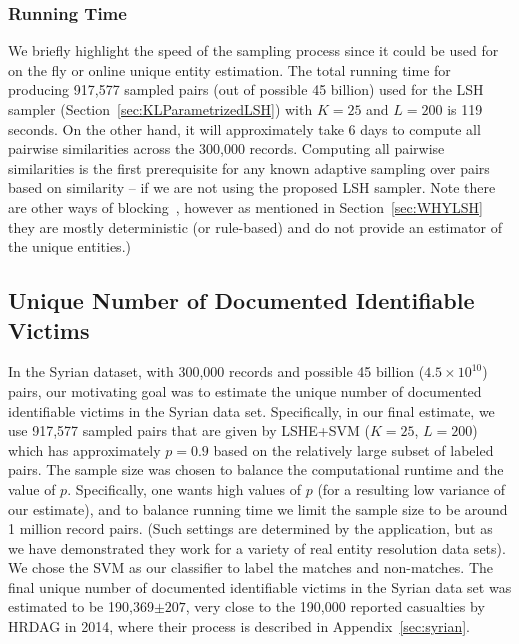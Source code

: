 \documentclass[aoas]{imsart}
\begin{document}

\subsubsection{Running Time}

We briefly highlight the speed of the sampling process since it could be used for on the fly or online unique entity estimation.
The total running time for producing 917,577 sampled pairs (out of possible 45 billion) used for the LSH sampler (Section~\ref{sec:KLParametrizedLSH}) with $K=25$ and $L=200$ is 119 seconds. On the other hand, it will approximately take 6 days to compute all pairwise similarities across the 300,000 records. Computing all pairwise similarities is the first prerequisite for any known adaptive sampling over pairs based on similarity -- if we are not using the proposed LSH sampler.
Note there are other ways of blocking~\citep{christen_2012}, however as mentioned in Section~\ref{sec:WHYLSH} they are mostly deterministic (or rule-based) and do not provide an estimator of the unique entities.)



\subsection{Unique Number of Documented Identifiable Victims}

In the Syrian dataset, with 300,000 records and possible 45 billion ($4.5 \times 10^{10}$) pairs, our motivating goal was to estimate the unique number of documented identifiable victims in the Syrian data set. Specifically, in our final estimate, we use
917,577 sampled pairs that are given by  LSHE+SVM  ($K = 25$, $L = 200$) which has approximately $p=0.9$ based on the relatively large subset of labeled pairs. The sample size was chosen to balance the computational runtime and the value of $p$.
Specifically, one wants high values of $p$ (for a resulting low variance of our estimate), and to balance running time we limit the sample size to be around 1 million record pairs. (Such settings are determined by the application, but as we have demonstrated they work for a variety of real entity resolution data sets). We chose the SVM as our classifier to label the matches and non-matches. The final unique number of documented identifiable victims in the Syrian data set was estimated to be 190,369$\pm207$, very close to the 190,000 reported casualties by HRDAG in 2014, where their process is described in Appendix~\ref{sec:syrian}.
\end{document}

